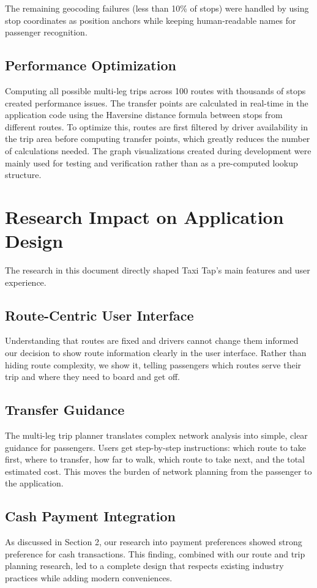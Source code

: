 \documentclass[a4paper,12pt]{article}
\begin{document}
The remaining geocoding failures (less than 10\% of stops) were handled by using stop coordinates as position anchors while keeping human-readable names for passenger recognition.

\subsection{Performance Optimization}
Computing all possible multi-leg trips across 100 routes with thousands of stops created performance issues. The transfer points are calculated in real-time in the application code using the Haversine distance formula between stops from different routes. To optimize this, routes are first filtered by driver availability in the trip area before computing transfer points, which greatly reduces the number of calculations needed. The graph visualizations created during development were mainly used for testing and verification rather than as a pre-computed lookup structure.

\section{Research Impact on Application Design}
The research in this document directly shaped Taxi Tap's main features and user experience.

\subsection{Route-Centric User Interface}
Understanding that routes are fixed and drivers cannot change them informed our decision to show route information clearly in the user interface. Rather than hiding route complexity, we show it, telling passengers which routes serve their trip and where they need to board and get off.

\subsection{Transfer Guidance}
The multi-leg trip planner translates complex network analysis into simple, clear guidance for passengers. Users get step-by-step instructions: which route to take first, where to transfer, how far to walk, which route to take next, and the total estimated cost. This moves the burden of network planning from the passenger to the application.

\subsection{Cash Payment Integration}
As discussed in Section 2, our research into payment preferences showed strong preference for cash transactions. This finding, combined with our route and trip planning research, led to a complete design that respects existing industry practices while adding modern conveniences.
\end{document}

